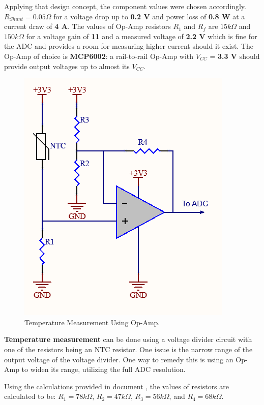 Applying that design concept, the component values were chosen accordingly. \textbf{$R_{Shunt} = 0.05 \Omega$} for a voltage drop up to \textbf{0.2 V} and power loss of \textbf{0.8 W} at a current draw of \textbf{4 A}. The values of Op-Amp resistors \textbf{$R_1$} and \textbf{$R_f$} are \textbf{$15 k\Omega$} and \textbf{$150 k\Omega$} for a voltage gain of \textbf{11} and a measured voltage of \textbf{2.2 V} which is fine for the ADC and provides a room for measuring higher current should it exist. The Op-Amp of choice is \textbf{MCP6002}: a rail-to-rail Op-Amp with $V_{CC}$ = \textbf{3.3 V} should provide output voltages up to almost its $V_{CC}$. 

\begin{figure}[h!]
    \centering
    \includegraphics[scale=0.5]{./Figures/HW/Temperature-Measurement.png}
    \caption{Temperature Measurement Using Op-Amp.\cite{op_amp_temperature}}
    \label{fig:hw-temp-mes}
\end{figure}

\textbf{Temperature measurement} 
can be done using a voltage divider circuit with one of the resistors being an NTC resistor. One issue is the narrow range of the output voltage of the voltage divider. One way to remedy this is using an Op-Amp to widen its range, utilizing the full ADC resolution. \cite{op_amp_temperature} 

Using the calculations provided in document \cite{op_amp_temperature}, the values of resistors are calculated to be: \textbf{$R_1 = 78 k\Omega$}, \textbf{$R_2 = 47 k\Omega$}, \textbf{$R_3 = 56 k\Omega$}, and \textbf{$R_4 = 68 k\Omega$}. 

